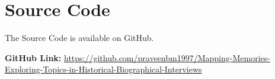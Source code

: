 \chapter{Source Code} %
\label{Source Code} %


\noindent The Source Code is available on GitHub. 

\noindent\textbf{GitHub Link:} \href{https://github.com/praveenbm1997/Mapping-Memories-Exploring-Topics-in-Historical-Biographical-Interviews}{https://github.com/praveenbm1997/Mapping-Memories-Exploring-Topics-in-Historical-Biographical-Interviews}